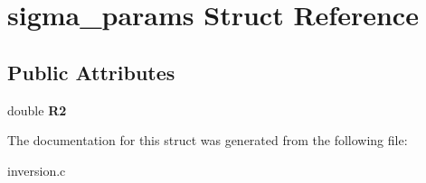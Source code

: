 \hypertarget{structsigma__params}{}\section{sigma\+\_\+params Struct Reference}
\label{structsigma__params}
\subsection*{Public Attributes}
\begin{DoxyCompactItemize}
\item 
\mbox{\label{structsigma__params_ae0d590f38b2df32874f87b33c874093f}} 
double {\bfseries R2}
\end{DoxyCompactItemize}


The documentation for this struct was generated from the following file\+:\begin{DoxyCompactItemize}
\item 
inversion.\+c\end{DoxyCompactItemize}

